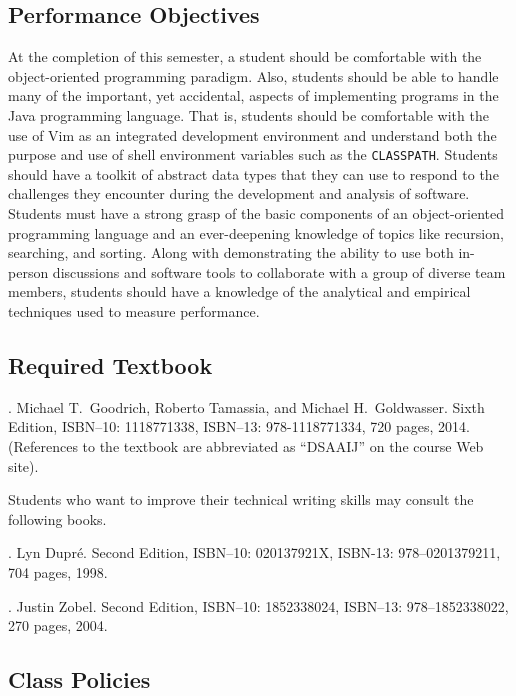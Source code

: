 \subsection*{Performance Objectives}

At the completion of this semester, a student should be comfortable with the object-oriented programming paradigm.
Also, students should be able to handle many of the important, yet accidental, aspects of implementing programs in the
Java programming language.  That is, students should be comfortable with the use of Vim as an integrated development
environment and understand both the purpose and use of shell environment variables such as the {\tt CLASSPATH}.
Students should have a toolkit of abstract data types that they can use to respond to the challenges they encounter
during the development and analysis of software.  Students must have a strong grasp of the basic components of an
object-oriented programming language and an ever-deepening knowledge of topics like recursion, searching, and sorting.
Along with demonstrating the ability to use both in-person discussions and software tools to collaborate with a group of
diverse team members, students should have a knowledge of the analytical and empirical techniques used to measure
performance.

\subsection*{Required Textbook}

. Michael T.\ Goodrich, Roberto Tamassia, and Michael H.\
Goldwasser. Sixth Edition, ISBN--10: 1118771338, ISBN--13: 978-1118771334, 720 pages, 2014. \\ (References to the
textbook are abbreviated as ``DSAAIJ'' on the course Web site).

\noindent
Students who want to improve their technical writing skills may consult the following books.

. Lyn Dupr\'e. Second Edition,  ISBN--10: 020137921X,
ISBN-13: 978--0201379211, 704 pages, 1998.

.  Justin Zobel. Second Edition,  ISBN--10: 1852338024, ISBN--13:
978--1852338022, 270 pages, 2004.

\subsection*{Class Policies}

